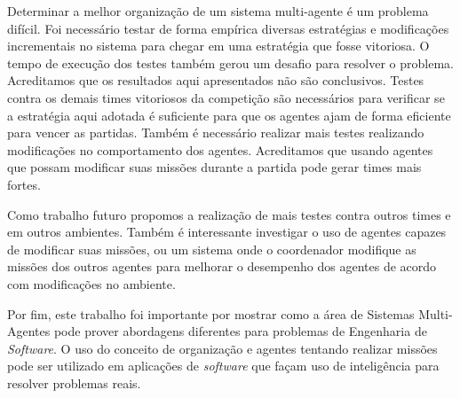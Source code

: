 \documentclass{llncs}
\begin{document}
Determinar a melhor organização de um sistema multi-agente é um problema difícil. Foi necessário testar de forma empírica diversas estratégias e modificações incrementais no sistema para chegar em uma estratégia que fosse vitoriosa. O tempo de execução dos testes também gerou um desafio para resolver o problema. Acreditamos que os resultados aqui apresentados não são conclusivos. Testes contra os demais times vitoriosos da competição são necessários para verificar se a estratégia aqui adotada é suficiente para que os agentes ajam de forma eficiente para vencer as partidas. Também é necessário realizar mais testes realizando modificações no comportamento dos agentes. Acreditamos que usando agentes que possam modificar suas missões durante a partida pode gerar times mais fortes.

Como trabalho futuro propomos a realização de mais testes contra outros times e em outros ambientes. Também é interessante investigar o uso de agentes capazes de modificar suas missões, ou um sistema onde o coordenador modifique as missões dos outros agentes para melhorar o desempenho dos agentes de acordo com modificações no ambiente.

Por fim, este trabalho foi importante por mostrar como a área de Sistemas Multi-Agentes pode prover abordagens diferentes para problemas de Engenharia de \textit{Software}. O uso do conceito de organização e agentes tentando realizar missões pode ser utilizado em aplicações de \textit{software} que façam uso de inteligência para resolver problemas reais.

{}

\end{document}
